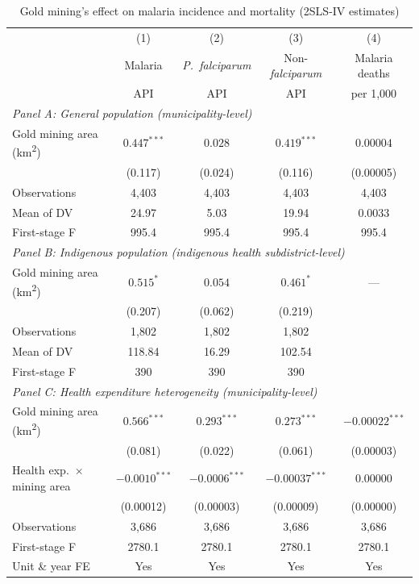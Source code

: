 \begin{table}[htbp]
\centering
\caption{Gold mining's effect on malaria incidence and mortality (2SLS-IV estimates)}
\label{tab:main_results}
\small
\begin{tabular}{l*{4}{c}}
\toprule
 & (1) & (2) & (3) & (4) \\
 & Malaria & \textit{P.~falciparum} & Non-\textit{falciparum} & Malaria deaths \\
 & API & API & API & per 1,000 \\
\midrule
\multicolumn{5}{l}{\textit{Panel A: General population (municipality-level)}} \\[3pt]
Gold mining area (km\textsuperscript{2}) & $0.447^{***}$ & $0.028$ & $0.419^{***}$ & $0.00004$ \\
 & (0.117) & (0.024) & (0.116) & (0.00005) \\[3pt]
Observations & 4,403 & 4,403 & 4,403 & 4,403 \\
Mean of DV & 24.97 & 5.03 & 19.94 & 0.0033 \\
First-stage F & 995.4 & 995.4 & 995.4 & 995.4 \\
\midrule
\multicolumn{5}{l}{\textit{Panel B: Indigenous population (indigenous health subdistrict-level)}} \\[3pt]
Gold mining area (km\textsuperscript{2}) & $0.515^{*}$ & $0.054$ & $0.461^{*}$ & --- \\
 & (0.207) & (0.062) & (0.219) &  \\[3pt]
Observations & 1,802 & 1,802 & 1,802 &  \\
Mean of DV & 118.84 & 16.29 & 102.54 &  \\
First-stage F & 390 & 390 & 390 &  \\
\midrule
\multicolumn{5}{l}{\textit{Panel C: Health expenditure heterogeneity (municipality-level)}} \\[3pt]
Gold mining area (km\textsuperscript{2}) & $0.566^{***}$ & $0.293^{***}$ & $0.273^{***}$ & $-0.00022^{***}$ \\
 & (0.081) & (0.022) & (0.061) & (0.00003) \\[3pt]
Health exp.~$\times$ mining area & $-0.0010^{***}$ & $-0.0006^{***}$ & $-0.00037^{***}$ & $0.00000$ \\
 & (0.00012) & (0.00003) & (0.00009) & (0.00000) \\[3pt]
Observations & 3,686 & 3,686 & 3,686 & 3,686 \\
First-stage F & 2780.1 & 2780.1 & 2780.1 & 2780.1 \\
\midrule
Unit \& year FE & Yes & Yes & Yes & Yes \\

\end{tabular}
\end{table}
